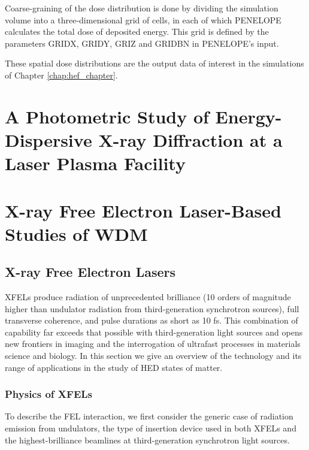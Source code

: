\documentclass [11pt, proquest, article] {uwthesis}[2016/11/22]
\begin{document}
Coarse-graining of the dose distribution is done by dividing the simulation volume into a three-dimensional grid of cells, in each of which PENELOPE calculates the total dose of deposited energy. This grid is defined by the parameters GRIDX, GRIDY, GRIZ and GRIDBN in PENELOPE's input.

These spatial dose distributions are the output data of interest in the simulations of Chapter \ref{chap:hef_chapter}.


%

\chapter{A Photometric Study of Energy-Dispersive X-ray Diffraction at a Laser Plasma Facility}
\label{edxrd}


\chapter{X-ray Free Electron Laser-Based Studies of WDM}
\label{xfel_experiment}
\section{X-ray Free Electron Lasers}
XFELs produce radiation of unprecedented brilliance (10 orders of magnitude higher than undulator radiation from third-generation synchrotron sources), full transverse coherence, and pulse durations as short as 10 fs. This combination of capability far exceeds that possible with third-generation light sources and opens new frontiers in imaging and the interrogation of ultrafast processes in materials science and biology.
In this section we give an overview of the technology and its range of applications in the study of HED states of matter.

\subsection{Physics of XFELs}
To describe the FEL interaction, we first consider the generic case of radiation emission from undulators, the type of insertion device used in both XFELs and the highest-brilliance beamlines at third-generation synchrotron light sources.
\end{document}
